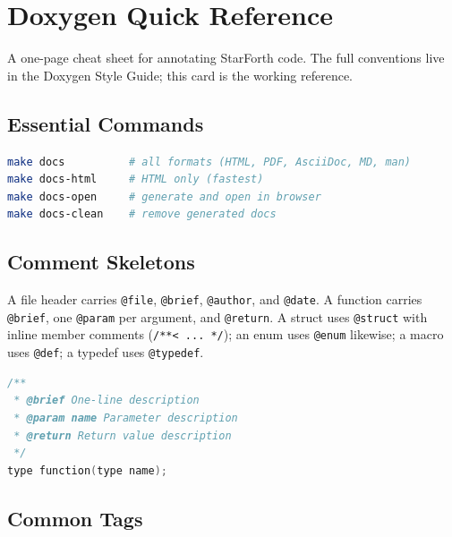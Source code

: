 
\section{Doxygen Quick Reference}

A one-page cheat sheet for annotating StarForth code. The full conventions live
in the Doxygen Style Guide; this card is the working reference.

\subsection{Essential Commands}

\begin{lstlisting}[language=bash]
make docs          # all formats (HTML, PDF, AsciiDoc, MD, man)
make docs-html     # HTML only (fastest)
make docs-open     # generate and open in browser
make docs-clean    # remove generated docs
\end{lstlisting}

\subsection{Comment Skeletons}

A file header carries \texttt{@file}, \texttt{@brief}, \texttt{@author}, and
\texttt{@date}. A function carries \texttt{@brief}, one \texttt{@param} per
argument, and \texttt{@return}. A struct uses \texttt{@struct} with inline
member comments (\texttt{/**< ... */}); an enum uses \texttt{@enum} likewise; a
macro uses \texttt{@def}; a typedef uses \texttt{@typedef}.

\begin{lstlisting}[language=C]
/**
 * @brief One-line description
 * @param name Parameter description
 * @return Return value description
 */
type function(type name);
\end{lstlisting}

\subsection{Common Tags}

